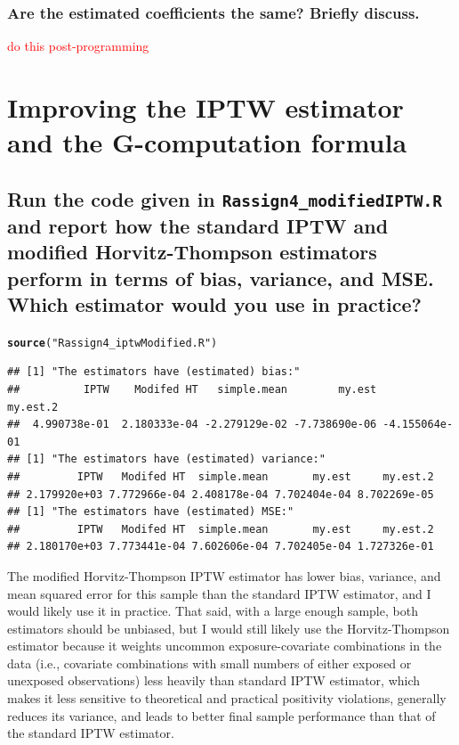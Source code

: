 \documentclass{article}\usepackage[]{graphicx}\usepackage[]{xcolor}
\makeatletter
\newcommand{\hlstr}[1]{\textcolor[rgb]{0.192,0.494,0.8}{#1}}%
\newcommand{\hlstd}[1]{\textcolor[rgb]{0.345,0.345,0.345}{#1}}%
\newcommand{\hlkwd}[1]{\textcolor[rgb]{0.737,0.353,0.396}{\textbf{#1}}}%
\newenvironment{kframe}{%
 \def\at@end@of@kframe{}%
 \ifinner\ifhmode%
  \def\at@end@of@kframe{\end{minipage}}%
  \begin{minipage}{\columnwidth}%
 \fi\fi%
 \def\FrameCommand##1{\hskip\@totalleftmargin \hskip-\fboxsep
 \colorbox{shadecolor}{##1}\hskip-\fboxsep
     \hskip-\linewidth \hskip-\@totalleftmargin \hskip\columnwidth}%
 \MakeFramed {\advance\hsize-\width
   \@totalleftmargin\z@ \linewidth\hsize
   \@setminipage}}%
 {\par\unskip\endMakeFramed%
 \at@end@of@kframe}
\newenvironment{knitrout}{}{} %
\makeatother
\begin{document}
  \subsubsection{Are the estimated coefficients the same? Briefly discuss.}
  
\textcolor{red}{do this post-programming}
  
\section{Improving the IPTW estimator and the G-computation formula}

  \subsection{Run the code given in \texttt{Rassign4\_modifiedIPTW.R} and report how the standard IPTW and modified Horvitz-Thompson estimators perform in terms of bias, variance, and MSE. Which estimator would you use in practice?}
  
\begin{knitrout}
\color{fgcolor}\begin{kframe}
\begin{alltt}
\hlkwd{source}\hlstd{(}\hlstr{"Rassign4_iptwModified.R"}\hlstd{)}
\end{alltt}
\begin{verbatim}
## [1] "The estimators have (estimated) bias:"
##          IPTW    Modifed HT   simple.mean        my.est      my.est.2 
##  4.990738e-01  2.180333e-04 -2.279129e-02 -7.738690e-06 -4.155064e-01 
## [1] "The estimators have (estimated) variance:"
##         IPTW   Modifed HT  simple.mean       my.est     my.est.2 
## 2.179920e+03 7.772966e-04 2.408178e-04 7.702404e-04 8.702269e-05 
## [1] "The estimators have (estimated) MSE:"
##         IPTW   Modifed HT  simple.mean       my.est     my.est.2 
## 2.180170e+03 7.773441e-04 7.602606e-04 7.702405e-04 1.727326e-01
\end{verbatim}
\end{kframe}
\end{knitrout}

The modified Horvitz-Thompson IPTW estimator has lower bias, variance, and mean squared error for this sample than the standard IPTW estimator, and I would likely use it in practice. That said, with a large enough sample, both estimators should be unbiased, but I would still likely use the Horvitz-Thompson estimator because it weights uncommon exposure-covariate combinations in the data (i.e., covariate combinations with small numbers of either exposed or unexposed observations) less heavily than standard IPTW estimator, which makes it less sensitive to theoretical and practical positivity violations, generally reduces its variance, and leads to better final sample performance than that of the standard IPTW estimator.
\end{document}
